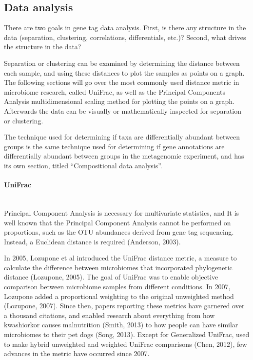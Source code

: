 \FloatBarrier

\subsection{Data analysis}
There are two goals in gene tag data analysis. First, is there any structure in the data (separation, clustering, correlations, differentials, etc.)? Second, what drives the structure in the data?

Separation or clustering can be examined by determining the distance between each sample, and using these distances to plot the samples as points on a graph. The following sections will go over the most commonly used distance metric in microbiome research, called UniFrac, as well as the Principal Components Analysis multidimensional scaling method for plotting the points on a graph. Afterwards the data can be visually or mathematically inspected for separation or clustering.

The technique used for determining if taxa are differentially abundant between groups is the same technique used for determining if gene annotations are differentially abundant between groups in the metagenomic experiment, and has its own section, titled “Compositional data analysis”.

\paragraph{UniFrac}\mbox{}\\
Principal Component Analysis is necessary for multivariate statistics, and It is well known that the Principal Component Analysis cannot be performed on proportions, such as the OTU abundances derived from gene tag sequencing. Instead, a Euclidean distance is required (Anderson, 2003).

In 2005, Lozupone et al introduced the UniFrac distance metric, a measure to calculate the difference between microbiomes that incorporated phylogenetic distance (Lozupone, 2005). The goal of UniFrac was to enable objective comparison between microbiome samples from different conditions. In 2007, Lozupone added a proportional weighting to the original unweighted method (Lozupone, 2007). Since then, papers reporting these metrics have garnered over a thousand citations, and enabled research about everything from how kwashiorkor causes malnutrition (Smith, 2013) to how people can have similar microbiomes to their pet dogs (Song, 2013).  Except for Generalized UniFrac, used to make hybrid unweighted and weighted UniFrac comparisons (Chen, 2012), few advances in the metric have occurred since 2007. 

